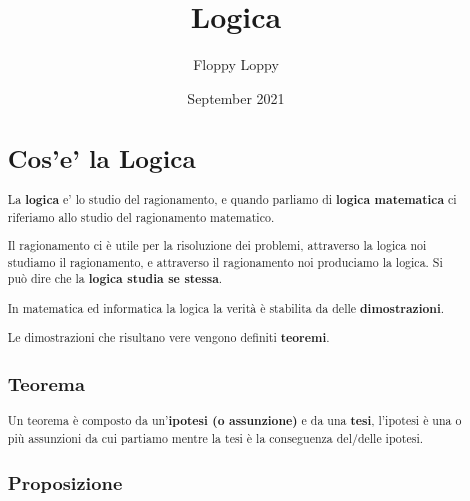 \documentclass{article}
\begin{document}
\title{Logica}
\author{Floppy Loppy}
\date{September 2021}
\maketitle



\begin{abstract}

\section{Cos'e' la Logica}

La \textbf{logica} e' lo studio del ragionamento, e quando parliamo di \textbf{logica matematica} ci riferiamo allo studio del ragionamento matematico. \par
Il ragionamento ci è utile per la risoluzione dei problemi, attraverso la logica noi studiamo il ragionamento, e attraverso il ragionamento noi produciamo la logica. Si può dire che la \textbf{logica studia se stessa}.\par
In matematica ed informatica la logica la verità è stabilita da delle \textbf{dimostrazioni}. \par
Le dimostrazioni che risultano vere vengono definiti \textbf{teoremi}.

\subsection{Teorema}
Un teorema è composto da un'\textbf{ipotesi (o assunzione)} e da una \textbf{tesi}, l'ipotesi è  una o più assunzioni da cui partiamo mentre la tesi è la conseguenza del/delle ipotesi.


\subsection{Proposizione}


\end{abstract}
\end{document}
